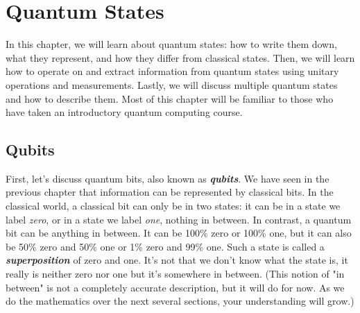 \chapter[Quantum States]{Quantum States}
\label{sec:2_quantum_states}





In this chapter, we will learn about quantum states: how to write them down, what they represent, and how they differ from classical states.
Then, we will learn how to operate on and extract information from quantum states using unitary operations and measurements.
Lastly, we will discuss multiple quantum states and how to describe them. 
Most of this chapter will be familiar to those who have taken an introductory quantum computing course.

\section{Qubits}






First, let's discuss quantum bits, also known as \textbf{\emph{qubits}}. We have seen in the previous chapter that information can be represented by classical bits. In the classical world, a classical bit can only be in two states: it can be in a state we label \emph{zero}, or in a state we label \emph{one}, nothing in between. In contrast, a quantum bit can be anything in between. It can be 100\% zero or 100\% one, but it can also be 50\% zero and 50\% one or 1\% zero and 99\% one. Such a state is called a \textbf{\emph{superposition}} of zero and one. It's not that we don't know what the state is, it really is neither zero nor one but it's somewhere in between. (This notion of "in between" is not a completely accurate description, but it will do for now.  As we do the mathematics over the next several sections, your understanding will grow.)

